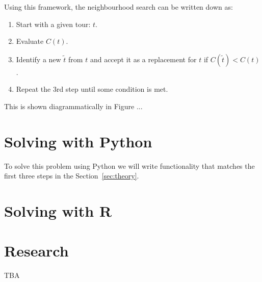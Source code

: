Using this framework, the neighbourhood search can be written down as:

\begin{enumerate}
    \item Start with a given tour: \(t\).
    \item Evaluate \(C(t)\).
    \item Identify a new \(\tilde t\) from \(t\) and accept it as a replacement
        for \(t\) if \(C(\tilde t)<
        C(t)\).
    \item Repeat the 3rd step until some condition is met.
\end{enumerate}

This is shown diagrammatically in Figure ... %
\section{Solving with Python}\label{sec:solving-with-python}

To solve this problem using Python we will write functionality that matches the
first three steps in the Section~\ref{sec:theory}.

\section{Solving with R}\label{sec:solving-with-R}

\section{Research}\label{sec:research}

TBA
